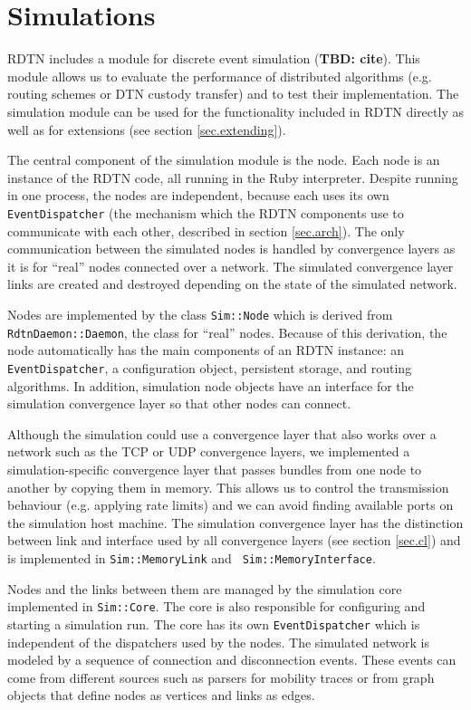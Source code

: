 \documentclass{article}
\begin{document}
\section{Simulations}\label{sec.sim}

RDTN includes a module for discrete event simulation ({\bf TBD: cite}). This
module allows us to evaluate the performance of distributed algorithms (e.g.
routing schemes or DTN custody transfer) and to test their implementation. The
simulation module can be used for the functionality included in RDTN
directly as well as for extensions (see section \ref{sec.extending}).

The central component of the simulation module is the node. Each node is an
instance of the RDTN code, all running in the Ruby interpreter. Despite running
in one process, the nodes are independent, because each uses its own {\tt
EventDispatcher} (the mechanism which the RDTN components use to communicate
with each other, described in section \ref{sec.arch}). The only communication
between the simulated nodes is handled by convergence layers as it is for
``real'' nodes connected over a network. The simulated convergence layer links
are created and destroyed depending on the state of the simulated network.

Nodes are implemented by the class {\tt Sim::Node} which is derived from {\tt
RdtnDaemon::Daemon}, the class for ``real'' nodes. Because of this derivation,
the node automatically has the main components of an RDTN instance: an {\tt
EventDispatcher}, a configuration object, persistent storage, and routing
algorithms. In addition, simulation node objects have an interface for the
simulation convergence layer so that other nodes can connect.

Although the simulation could use a convergence layer that also works over a
network such as the TCP or UDP convergence layers, we implemented a
simulation-specific convergence layer that passes bundles from one node to
another by copying them in memory. This allows us to control the transmission
behaviour (e.g. applying rate limits) and we can avoid finding available ports
on the simulation host machine. The simulation convergence layer has
the distinction between link and interface used by all convergence layers (see
section \ref{sec.cl}) and is implemented in {\tt Sim::MemoryLink} and {\tt
Sim::MemoryInterface}.

Nodes and the links between them are managed by the simulation core implemented
in {\tt Sim::Core}. The core is also responsible for configuring and starting a
simulation run. The core has its own {\tt EventDispatcher} which is independent
of the dispatchers used by the nodes. The simulated network is modeled by a
sequence of connection and disconnection events. These events can come from
different sources such as parsers for mobility traces or from graph objects that
define nodes as vertices and links as edges.
\end{document}
